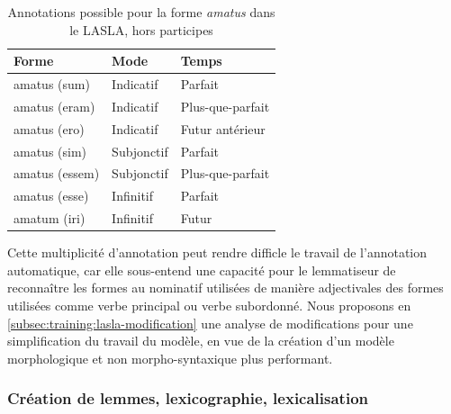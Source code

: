 
\newpara

\begin{table}[h]
\centering
\begin{tabular}{@{}lll@{}}
\toprule
Forme & Mode & Temps \\ \midrule
amatus (sum) & Indicatif & Parfait \\
amatus (eram) & Indicatif & Plus-que-parfait \\
amatus (ero) & Indicatif & Futur antérieur \\
amatus (sim) & Subjonctif & Parfait \\
amatus (essem) & Subjonctif & Plus-que-parfait \\
amatus (esse) & Infinitif & Parfait \\
amatum (iri) & Infinitif & Futur \\ \bottomrule
\end{tabular}
\caption{Annotations possible pour la forme \textit{amatus} dans le LASLA, hors participes}
\label{table:amatus_forms}
\end{table}

Cette multiplicité d'annotation peut rendre difficle le travail de l'annotation automatique, car elle sous-entend une capacité pour le lemmatiseur de reconnaître les formes au nominatif utilisées de manière adjectivales des formes utilisées comme verbe principal ou verbe subordonné. Nous proposons en \ref{subsec:training:lasla-modification} une analyse de modifications pour une simplification du travail du modèle, en vue de la création d'un modèle morphologique et non morpho-syntaxique plus performant.

\subsubsection{Création de lemmes, lexicographie, lexicalisation}

